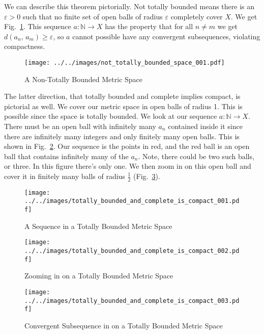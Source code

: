 \documentclass{article}
\theoremstyle{plain}
\theoremstyle{normal}
\begin{document}
        We can describe this theorem pictorially. Not totally bounded means
        there is an $\varepsilon>0$ such that no finite set of open balls of
        radius $\varepsilon$ completely cover $X$. We get
        Fig.~\ref{fig:not_totally_bounded_space_001}. This sequence
        $a:\mathbb{N}\rightarrow{X}$ has the property that for all
        $n\ne{m}$ we get $d(a_{n},\,a_{m})\geq\varepsilon$, so $a$ cannot
        possible have any convergent subsequences, violating compactness.
        \begin{figure}
            \centering
            \texttt{[image: ../../images/not\_totally\_bounded\_space\_001.pdf]}
            \caption{A Non-Totally Bounded Metric Space}
            \label{fig:not_totally_bounded_space_001}
        \end{figure}
        The latter direction, that totally bounded and complete implies
        compact, is pictorial as well. We cover our metric space in open
        balls of radius 1. This is possible since the space is totally bounded.
        We look at our sequence $a:\mathbb{N}\rightarrow{X}$. There must be an
        open ball with infinitely many $a_{n}$ contained inside it since there
        are infinitely many integers and only finitely many open balls.
        This is shown in
        Fig.~\ref{fig:totally_bounded_and_complete_is_compact_001}. Our
        sequence is the points in red, and the red ball is an open ball that
        contains infinitely many of the $a_{n}$. Note, there could be two such
        balls, or three. In this figure there's only one. We then zoom in on
        this open ball and cover it in finitely many balls of radius
        $\frac{1}{2}$ (Fig.~\ref{fig:totally_bounded_and_complete_is_compact_002}).
        \begin{figure}
            \centering
            \texttt{[image: ../../images/totally\_bounded\_and\_complete\_is\_compact\_001.pdf]}
            \caption{A Sequence in a Totally Bounded Metric Space}
            \label{fig:totally_bounded_and_complete_is_compact_001}
        \end{figure}
        \begin{figure}
            \centering
            \texttt{[image: ../../images/totally\_bounded\_and\_complete\_is\_compact\_002.pdf]}
            \caption{Zooming in on a Totally Bounded Metric Space}
            \label{fig:totally_bounded_and_complete_is_compact_002}
        \end{figure}
        \begin{figure}
            \centering
            \texttt{[image: ../../images/totally\_bounded\_and\_complete\_is\_compact\_003.pdf]}
            \caption{Convergent Subsequence in on a Totally Bounded Metric Space}
            \label{fig:totally_bounded_and_complete_is_compact_003}
        \end{figure}
\end{document}
